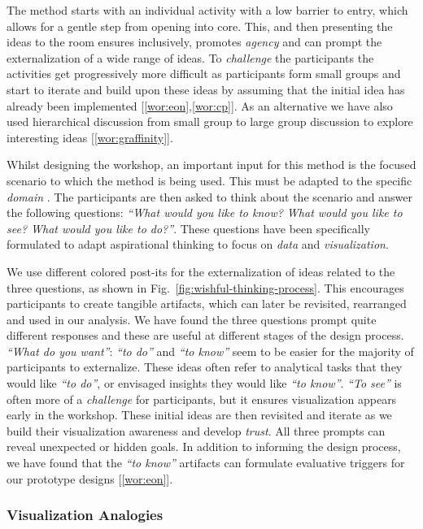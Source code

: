 The method starts with an individual activity with a low barrier to entry, which allows for a gentle step from opening into core. This, and then presenting the ideas to the room ensures inclusively, promotes \emph{agency} and can prompt the externalization of a wide range of ideas. To \emph{challenge} the participants the activities get progressively more difficult as participants form small groups and start to iterate and build upon these ideas by assuming that the initial idea has already been implemented [\ref{wor:eon},\ref{wor:cp}]. As an alternative we have also used hierarchical discussion from small group to large group discussion to explore interesting ideas [\ref{wor:graffinity}].

Whilst designing the workshop, an important input for this method is the focused scenario to which the method is being used. This must be adapted to the specific \emph{domain} . The participants are then asked to think about the scenario and answer the following questions: \emph{``What would you like to know? What would you like to see? What would you like to do?''}. These questions have been specifically formulated to adapt aspirational thinking to focus on \emph{data} and \emph{visualization}. 

We use different colored post-its for the externalization of ideas related to the three questions, as shown in Fig.~\ref{fig:wishful-thinking-process}. This encourages participants to create tangible artifacts, which can later be revisited, rearranged and used in our analysis. We have found the three questions prompt quite different responses and these are useful at different stages of the design process. \emph{``What do you want''}: \emph{``to do''} and \emph{``to know''} seem to be easier for the majority of participants to externalize. These ideas often refer to analytical tasks that they would like \emph{``to do''}, or envisaged insights they would like \emph{``to know''}.  \emph{``To see''} is often more of a \emph{challenge} for participants, but it ensures visualization appears early in the workshop. These initial ideas are then revisited and iterate as we build their visualization awareness and develop \emph{trust}. All three prompts can reveal unexpected or hidden goals. In addition to informing the design process, we have found that the \emph{``to know''} artifacts can formulate evaluative triggers for our prototype designs [\ref{wor:eon}].

\subsubsection{Visualization Analogies}

